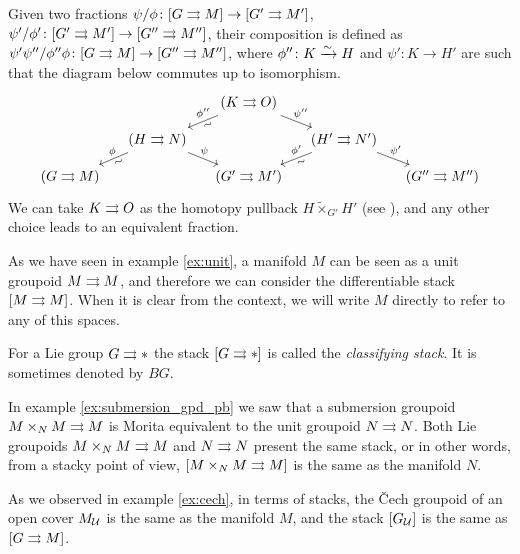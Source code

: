 Given two fractions $\psi/\phi\colon [G\rightrightarrows M]\to [G'\rightrightarrows M']$, $\psi'/\phi'\colon [G'\rightrightarrows M']\to [G''\rightrightarrows M'']$, their composition is defined as $\psi'\psi''/\phi''\phi\colon [G\rightrightarrows M]\to [G''\rightrightarrows M'']$, where $\phi''\colon K\xrightarrow\sim H$ and $\psi'\colon K\to H'$ are such that the diagram below commutes up to isomorphism.
\begin{equation}
\begin{tikzcd}[sep=small]
  & & (K\tto O) \ar{dl}[pos=.4, sloped, below]{\sim}[above]{\phi''} \ar{dr}[pos=.3, yshift=-2pt]{\psi''} & & \\
  & (H\tto N) \ar{dl}[pos=.4, sloped, below]{\sim}[pos=.55, above]{\phi} \ar{dr}[pos=.3, yshift=-2pt]{\psi} & & (H'\tto N') \ar{dl}[pos=.4, sloped, below]{\sim}[above]{\phi'} \ar{dr}[pos=.3, yshift=-2pt]{\psi'} & \\
  (G\tto M) & & (G'\tto M') & & (G''\tto M'')
\end{tikzcd}
\end{equation}
We can take $K\rightrightarrows O$ as the homotopy pullback $H\tilde\times_{G'} H'$ (see \cite[]{dh13}), and any other choice leads to an equivalent fraction.

\begin{example}
As we have seen in example \ref{ex:unit}, a manifold $M$ can be seen as a unit groupoid $M\rightrightarrows M$, and therefore we can consider the differentiable stack $[M\rightrightarrows M]$. When it is clear from the context, we will write $M$ directly to refer to any of this spaces.
\end{example}

\begin{example}
For a Lie group $G\rightrightarrows *$ the stack $[G\rightrightarrows *]$ is called the \emph{classifying stack}.
It is sometimes denoted by $BG$.
\end{example}

\begin{example}
In example \ref{ex:submersion_gpd_pb} we saw that a submersion groupoid $M\times_N M\rightrightarrows M$ is Morita equivalent to the unit groupoid $N\rightrightarrows N$.
Both Lie groupoids $M\times_N M\rightrightarrows M$ and $N\rightrightarrows N$ present the same stack, or in other words, from a stacky point of view, $[M\times_N M\rightrightarrows M]$ is the same as the manifold $N$.
\end{example}

\begin{example}
As we observed in example \ref{ex:cech}, in terms of stacks, the \v Cech groupoid of an open cover $M_\mathcal U$ is the same as the manifold $M$, and the stack $[G_\mathcal U]$ is the same as $[G\rightrightarrows M]$.
\end{example}

